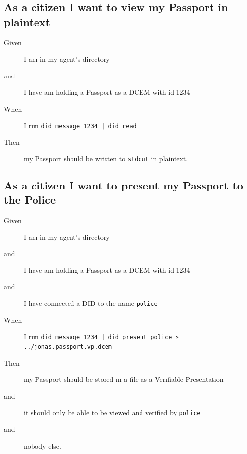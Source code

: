 \subsection{As a citizen I want to view my Passport in plaintext}
\begin{description}\begin{description}
    \item[Given] I am in my agent's directory
    \item[and] I have am holding a Passport as a DCEM with id 1234
    \item[When] I run \texttt{did message 1234 | did read}
    \item[Then] my Passport should be written to \texttt{stdout} in plaintext.
\end{description}\end{description}



\subsection{As a citizen I want to present my Passport to the Police}
\begin{description}\begin{description}
    \item[Given] I am in my agent's directory
    \item[and] I have am holding a Passport as a DCEM with id 1234
    \item[and] I have connected a DID to the name \texttt{police}
    \item[When] I run \texttt{did message 1234 | did present police > ../jonas.passport.vp.dcem}
    \item[Then] my Passport should be stored in a file as a Verifiable Presentation
    \item[and] it should only be able to be viewed and verified by \texttt{police}
    \item[and] nobody else.
\end{description}\end{description}



